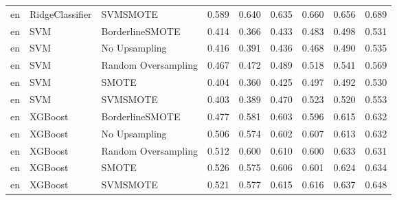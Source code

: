 \begin{tabular}{lllllllll}
      en &              RidgeClassifier &            SVMSMOTE & 0.589 &                     0.640 &                 0.635 &                  0.660 &                                   0.656 &     0.689 \\
      en &                          SVM &     BorderlineSMOTE & 0.414 &                     0.366 &                 0.433 &                  0.483 &                                   0.498 &     0.531 \\
      en &                          SVM &       No Upsampling & 0.416 &                     0.391 &                 0.436 &                  0.468 &                                   0.490 &     0.535 \\
      en &                          SVM & Random Oversampling & 0.467 &                     0.472 &                 0.489 &                  0.518 &                                   0.541 &     0.569 \\
      en &                          SVM &               SMOTE & 0.404 &                     0.360 &                 0.425 &                  0.497 &                                   0.492 &     0.530 \\
      en &                          SVM &            SVMSMOTE & 0.403 &                     0.389 &                 0.470 &                  0.523 &                                   0.520 &     0.553 \\
      en &                      XGBoost &     BorderlineSMOTE & 0.477 &                     0.581 &                 0.603 &                  0.596 &                                   0.615 &     0.632 \\
      en &                      XGBoost &       No Upsampling & 0.506 &                     0.574 &                 0.602 &                  0.607 &                                   0.613 &     0.632 \\
      en &                      XGBoost & Random Oversampling & 0.512 &                     0.600 &                 0.610 &                  0.600 &                                   0.633 &     0.631 \\
      en &                      XGBoost &               SMOTE & 0.526 &                     0.575 &                 0.606 &                  0.601 &                                   0.624 &     0.634 \\
      en &                      XGBoost &            SVMSMOTE & 0.521 &                     0.577 &                 0.615 &                  0.616 &                                   0.637 &     0.648 \\

\end{tabular}
